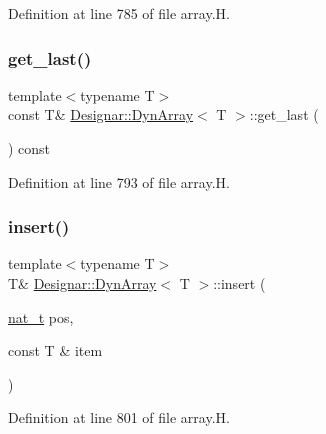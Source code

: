 Definition at line 785 of file array.\+H.

\mbox{\label{class_designar_1_1_dyn_array_a45db099e907ae4ed4398cfea487bb4d7}} 
\subsubsection{\texorpdfstring{get\+\_\+last()}{get\_last()}\hspace{0.1cm}{\footnotesize\ttfamily [2/2]}}
{\footnotesize\ttfamily template$<$typename T$>$ \\
const T\& \hyperlink{class_designar_1_1_dyn_array}{Designar\+::\+Dyn\+Array}$<$ T $>$\+::get\+\_\+last (\begin{DoxyParamCaption}{ }\end{DoxyParamCaption}) const\hspace{0.3cm}{\ttfamily [inline]}}



Definition at line 793 of file array.\+H.

\mbox{\label{class_designar_1_1_dyn_array_a480d65a0b64bc30d26806cdbd07e66f1}} 
\subsubsection{\texorpdfstring{insert()}{insert()}\hspace{0.1cm}{\footnotesize\ttfamily [1/4]}}
{\footnotesize\ttfamily template$<$typename T$>$ \\
T\& \hyperlink{class_designar_1_1_dyn_array}{Designar\+::\+Dyn\+Array}$<$ T $>$\+::insert (\begin{DoxyParamCaption}\item[{\hyperlink{namespace_designar_aa72662848b9f4815e7bf31a7cf3e33d1}{nat\+\_\+t}}]{pos,  }\item[{const T \&}]{item }\end{DoxyParamCaption})\hspace{0.3cm}{\ttfamily [inline]}}



Definition at line 801 of file array.\+H.

